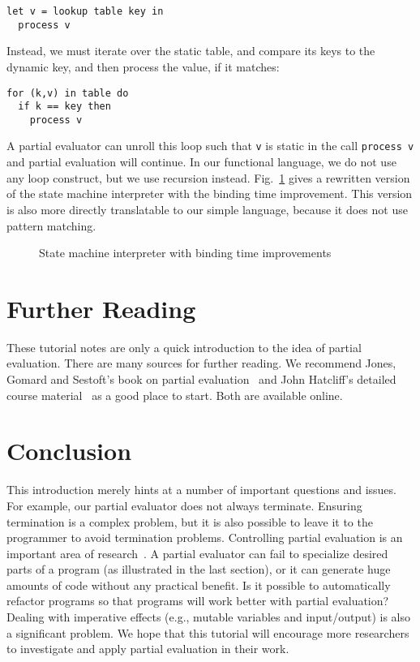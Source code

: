 \documentclass{eptcs}
\begin{document}
\begin{lstlisting}
let v = lookup table key in
  process v
\end{lstlisting}

Instead, we must iterate over the static table, and compare its keys
to the dynamic key, and then process the value, if it matches:

\begin{lstlisting}
for (k,v) in table do
  if k == key then
    process v
\end{lstlisting}

A partial evaluator can unroll this loop such that \lstinline{v} is
static in the call \lstinline{process v} and partial evaluation will
continue. In our functional language, we do not use any loop
construct, but we use recursion instead. Fig.~\ref{dfafinal} gives a
rewritten version of the state machine interpreter with the binding
time improvement. This version is also more directly translatable to
our simple language, because it does not use pattern matching.

\begin{figure}[t!]
 \caption{State machine interpreter with binding time improvements}
\label{dfafinal}
\bigskip
\end{figure}


\section{Further Reading}

These tutorial notes are only a quick introduction to the idea of partial 
evaluation. There are many sources for further reading. 
We recommend Jones, Gomard and Sestoft's book on partial
evaluation~\cite{PartialEvalBookGomard} and 
John Hatcliff's detailed course material~\cite{Hatcliff_foundationsfor}
as a good place to start. Both are available online.

\section{Conclusion}\label{conclusion}

This introduction merely hints at a number of important questions
and issues. For example, our partial evaluator does not always terminate.
Ensuring termination is a complex problem, but it is also possible to 
leave it to the programmer to avoid termination problems. 
Controlling partial evaluation is an important area of research~\cite{LeMeur:2002:TBG:503032.503033}.
A partial evaluator can fail to specialize 
desired parts of a program (as illustrated in the last section), or 
it can generate huge amounts of code without any practical benefit. 
Is it possible to automatically refactor programs so that
programs will work better with partial evaluation?
Dealing with imperative effects (e.g., mutable variables and input/output)
is also a significant problem. We hope that this tutorial will 
encourage more researchers to investigate and apply partial evaluation 
in their work.



\end{document}
